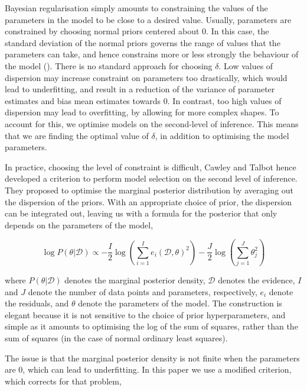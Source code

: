 \documentclass[11pt, oneside]{article}
\begin{document}
Bayesian regularisation simply amounts to constraining the values of the parameters in the model to be close to a desired value. 
Usually, parameters are constrained by choosing normal priors centered about 0.
In this case, the standard deviation of the normal priors governs the range of values that the parameters can take, and hence constrains more or less strongly the behaviour of the model (\cite{Cawley2007}).
There is no standard approach for choosing $\delta$.
Low values of dispersion may increase constraint on parameters too drastically, which would lead to underfitting, and result in a reduction of the variance of parameter estimates and bias mean estimates towards 0.
In contrast, too high values of dispersion may lead to overfitting, by allowing for more complex shapes.
To account for this, we optimise models on the second-level of inference.
This means that we are finding the optimal value of $\delta$, in addition to optimising the model parameters. 

In practice, choosing the level of constraint is difficult, Cawley and Talbot hence developed a criterion to perform model selection on the second level of inference.
They proposed to optimise the marginal posterior distribution by averaging out the dispersion of the priors.
With an appropriate choice of prior, the dispersion can be integrated out, leaving us with a formula for the posterior that only depends on the parameters of the model,

\begin{equation}
	\log P(\theta | \mathcal{D}) \propto - \frac{I}{2} \log \left(\sum_{i=1}^{I} e_i(\mathcal{D},\theta)^2\right) - \frac{J}{2} \log \left(\sum_{j=1}^{J} \theta_{j}^2 \right)
\end{equation}

where $P(\theta|\mathcal{D})$ denotes the marginal posterior density, $\mathcal{D}$ denotes the evidence, $I$ and $J$ denote the number of data points and parameters, respectively, $e_i$ denote the residuals, and $\theta$ denote the parameters of the model.
The construction is elegant because it is not sensitive to the choice of prior hyperparameters, and simple as it amounts to optimising the log of the sum of squares, rather than the sum of squares (in the case of normal ordinary least squares).

The issue is that the marginal posterior density is not finite when the parameters are 0, which can lead to underfitting.
In this paper we use a modified criterion, which corrects for that problem,
\end{document}
